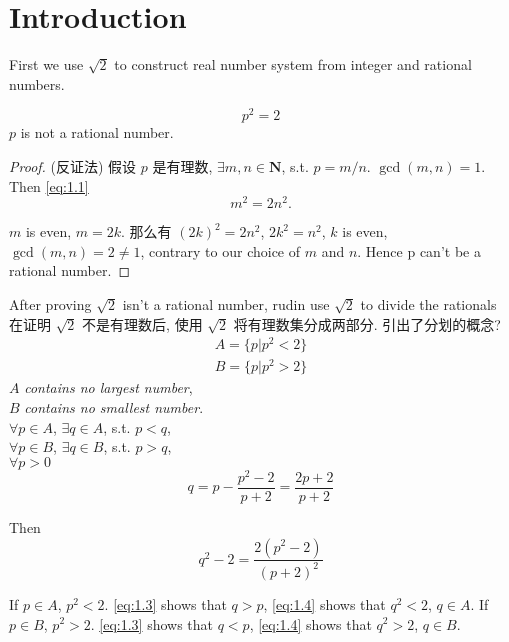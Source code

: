 
\section{Introduction}
First we use $\sqrt{2}$ to construct real number system from integer and rational numbers.

\begin{myExample}\label{Example:1.1}
\begin{equation}\label{eq:1.1}
    p^2=2
\end{equation}
$p$ is not a rational number.
\end{myExample}

\begin{proof}
(反证法) 假设 $p$ 是有理数,  $\exists m,n \in \mathbf{N}$, s.t. $p=m/n$. $\gcd (m,n) = 1$.
Then \ref{eq:1.1}
\begin{equation}\label{eq:1.2}
    m^2 = 2n^2.
\end{equation}

$m$ is even, $m = 2k$.
那么有 $(2k)^2 = 2n^2$, $2k^2 = n^2$, $k$ is even, $\gcd (m,n)=2\neq 1$,
contrary to our choice of $m$ and $n$. Hence p can't be a rational number.
\end{proof}

After proving $\sqrt{2}$ isn't a rational number, rudin use $\sqrt{2}$ to divide the rationals
在证明 $\sqrt{2}$ 不是有理数后, 使用 $\sqrt{2}$ 将有理数集分成两部分.  引出了分划的概念? 
\begin{align*}
    A = \{p|p^2<2\}\\
    B = \{p|p^2>2\}
\end{align*}
$A$ \emph{contains no largest number},\\
$B$ \emph{contains no smallest number}.\\
$\forall p\in A$, $\exists q\in A$, s.t. $p<q$,\\
$\forall p\in B$, $\exists q\in B$, s.t. $p>q$,\\
$\forall p>0$
\begin{equation}\label{eq:1.3}
    q = p-\frac{p^2-2}{p+2} = \frac{2p+2}{p+2}
\end{equation}

Then 
\begin{equation}
    \label{eq:1.4}
    q^2 - 2 = \frac{2(p^2-2)}{(p+2)^2}
\end{equation}

If $p\in A$, $p^2<2$. \ref{eq:1.3} shows that $q>p$, \ref{eq:1.4} shows that $q^2<2$, $q\in A$.
If $p\in B$, $p^2>2$. \ref{eq:1.3} shows that $q<p$, \ref{eq:1.4} shows that $q^2>2$, $q\in B$.


